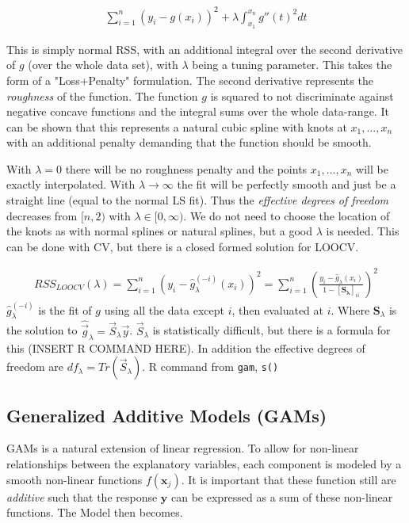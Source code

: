 \documentclass{article}
\renewcommand{\vec}[1]{\mathbf{#1}} %
\begin{document}
\begin{align*}
    \sum_{i=1}^{n} (y_i-g(x_i))^2 + \lambda \int_{x_1}^{x_n} g''(t)^2 dt
\end{align*}

This is simply normal RSS, with an additional integral over the second derivative of $g$ (over the whole data set), with $\lambda$ being a tuning parameter. This takes the form of a "Loss+Penalty" formulation. The second derivative represents the \textit{roughness} of the function. The function $g$ is squared to not discriminate against negative concave functions and the integral sums over the whole data-range. It can be shown that this represents a natural cubic spline with knots at $x_1, ... , x_n$ with an additional penalty demanding that the function should be smooth.   

With $\lambda = 0$ there will be no roughness penalty and the points $x_1, ... , x_n$ will be exactly interpolated. With $\lambda \rightarrow \infty$ the fit will be perfectly smooth and just be a straight line (equal to the normal LS fit). Thus the \textit{effective degrees of freedom} decreases from $[n,2)$ with $\lambda \in [0, \infty)$. We do not need to choose the location of the knots as with normal splines or natural splines, but a good $\lambda$ is needed. This can be done with CV, but there is a closed formed solution for LOOCV.

\begin{align*}
    RSS_{LOOCV}(\lambda) = \sum_{i=1}^n \left( y_i - \hat{g}_\lambda^{(-i)} (x_i)\right)^2 = \sum_{i=1}^n \left( \frac{y_i - \hat{g}_\lambda (x_i)}{1-[\vec{S_\lambda}]_{ii} } \right)^2
\end{align*}
$\hat{g}_\lambda^{(-i)}$ is the fit of $g$ using all the data except $i$, then evaluated at $i$. Where $\vec{S}_\lambda$ is the solution to $\hat{\Vec{g}}_\lambda = \Vec{S}_\lambda \Vec{y}$. $\Vec{S}_\lambda$ is statistically difficult, but there is a formula for this (INSERT R COMMAND HERE). In addition the effective degrees of freedom are $df_\lambda = Tr(\Vec{S}_\lambda)$.  R command from \texttt{gam}, \texttt{s()}

\subsection{Generalized Additive Models (GAMs)}
GAMs is a natural extension of linear regression. To allow for non-linear relationships between the explanatory variables, each component is modeled by a smooth non-linear functions $f(\vec{x}_j)$. It is important that these function still are \textit{additive} such that the response $\vec{y}$ can be expressed as a sum of these non-linear functions. The Model then becomes.
\end{document}
